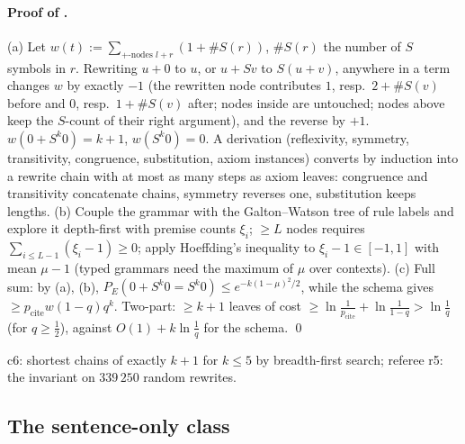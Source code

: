 \paragraph{Proof of .} (a) Let $w(t):=\sum_{+\text{-nodes }l+r}(1+\#S(r))$, $\#S(r)$ the number of $S$ symbols in $r$. Rewriting $u+0$ to $u$, or $u+Sv$ to $S(u+v)$, anywhere in a term changes $w$ by exactly $-1$ (the rewritten node contributes $1$, resp.\ $2+\#S(v)$ before and $0$, resp.\ $1+\#S(v)$ after; nodes inside are untouched; nodes above keep the $S$-count of their right argument), and the reverse by $+1$. $w(0+S^k0)=k+1$, $w(S^k0)=0$. A derivation (reflexivity, symmetry, transitivity, congruence, substitution, axiom instances) converts by induction into a rewrite chain with at most as many steps as axiom leaves: congruence and transitivity concatenate chains, symmetry reverses one, substitution keeps lengths. (b) Couple the grammar with the Galton--Watson tree of rule labels and explore it depth-first with premise counts $\xi_i$; $\ge L$ nodes requires $\sum_{i\le L-1}(\xi_i-1)\ge0$; apply Hoeffding's inequality \citep{hoeffding1963probability} to $\xi_i-1\in[-1,1]$ with mean $\mu-1$ (typed grammars need the maximum of $\mu$ over contexts). (c) Full sum: by (a), (b), $P_E(0+S^k0=S^k0)\le e^{-k(1-\mu)^2/2}$, while the schema gives $\ge p_{\mathrm{cite}}w(1-q)q^k$. Two-part: $\ge k+1$ leaves of cost $\ge\ln\frac1{p_{\mathrm{cite}}}+\ln\frac1{1-q}>\ln\frac1q$ (for $q\ge\tfrac12$), against $O(1)+k\ln\frac1q$ for the schema. \qed

c6: shortest chains of exactly $k+1$ for $k\le5$ by breadth-first search; referee r5: the invariant on $339\,250$ random rewrites.

\subsection{The sentence-only class}\label{app:univ:sentences}

